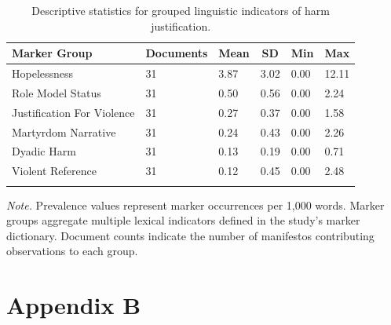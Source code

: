 \documentclass[
  english,
  man,floatsintext]{apa6}
\begin{document}
\begin{table}[H]

\begin{center}
\begin{threeparttable}

\caption{\label{tab:group-descriptives}Descriptive statistics for grouped linguistic indicators of harm justification.}

\begin{tabular}{llllll}
\toprule
Marker Group & \multicolumn{1}{c}{Documents} & \multicolumn{1}{c}{Mean} & \multicolumn{1}{c}{SD} & \multicolumn{1}{c}{Min} & \multicolumn{1}{c}{Max}\\
\midrule
Hopelessness & 31 & 3.87 & 3.02 & 0.00 & 12.11\\
Role Model Status & 31 & 0.50 & 0.56 & 0.00 & 2.24\\
Justification For Violence & 31 & 0.27 & 0.37 & 0.00 & 1.58\\
Martyrdom Narrative & 31 & 0.24 & 0.43 & 0.00 & 2.26\\
Dyadic Harm & 31 & 0.13 & 0.19 & 0.00 & 0.71\\
Violent Reference & 31 & 0.12 & 0.45 & 0.00 & 2.48\\
\bottomrule
\addlinespace
\end{tabular}

\begin{tablenotes}[para]
\normalsize{\textit{Note.} Prevalence values represent marker occurrences per 1,000 words. Marker groups aggregate multiple lexical indicators defined in the study's marker dictionary. Document counts indicate the number of manifestos contributing observations to each group.}
\end{tablenotes}

\end{threeparttable}
\end{center}

\end{table}

\newpage

\clearpage

\section{Appendix B}\label{appendix-b}
\end{document}
